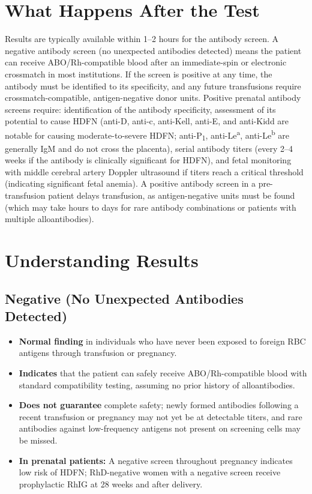 \section*{What Happens After the Test}
Results are typically available within 1--2 hours for the antibody screen. A negative antibody screen (no unexpected antibodies detected) means the patient can receive ABO/Rh-compatible blood after an immediate-spin or electronic crossmatch in most institutions. If the screen is positive at any time, the antibody must be identified to its specificity, and any future transfusions require crossmatch-compatible, antigen-negative donor units. Positive prenatal antibody screens require: identification of the antibody specificity, assessment of its potential to cause HDFN (anti-D, anti-c, anti-Kell, anti-E, and anti-Kidd are notable for causing moderate-to-severe HDFN; anti-P\textsubscript{1}, anti-Le\textsuperscript{a}, anti-Le\textsuperscript{b} are generally IgM and do not cross the placenta), serial antibody titers (every 2--4 weeks if the antibody is clinically significant for HDFN), and fetal monitoring with middle cerebral artery Doppler ultrasound if titers reach a critical threshold (indicating significant fetal anemia). A positive antibody screen in a pre-transfusion patient delays transfusion, as antigen-negative units must be found (which may take hours to days for rare antibody combinations or patients with multiple alloantibodies).

\section*{Understanding Results}

\subsection*{Negative (No Unexpected Antibodies Detected)}
\begin{itemize}
  \item \textbf{Normal finding} in individuals who have never been exposed to foreign RBC antigens through transfusion or pregnancy.
  \item \textbf{Indicates} that the patient can safely receive ABO/Rh-compatible blood with standard compatibility testing, assuming no prior history of alloantibodies.
  \item \textbf{Does not guarantee} complete safety; newly formed antibodies following a recent transfusion or pregnancy may not yet be at detectable titers, and rare antibodies against low-frequency antigens not present on screening cells may be missed.
  \item \textbf{In prenatal patients:} A negative screen throughout pregnancy indicates low risk of HDFN; RhD-negative women with a negative screen receive prophylactic RhIG at 28 weeks and after delivery.
\end{itemize}

